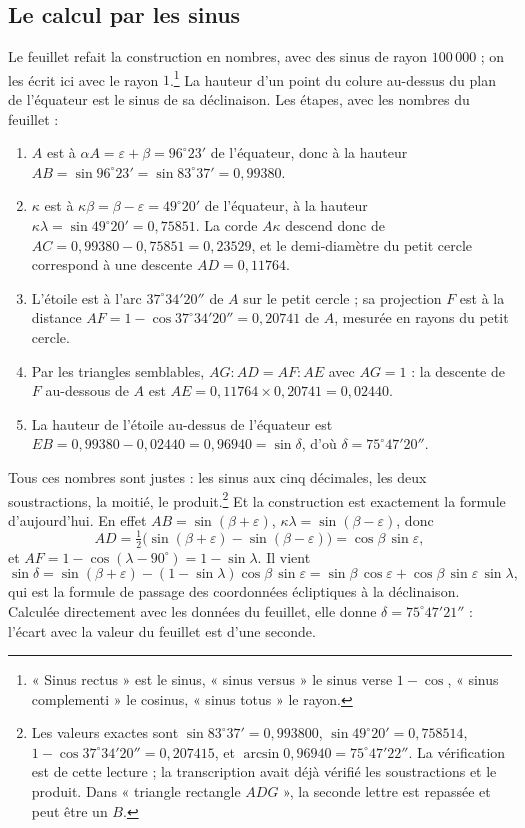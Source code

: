 \documentclass[11pt,a4paper]{article}
\begin{document}
\subsection*{Le calcul par les sinus}

Le feuillet refait la construction en nombres, avec des sinus de rayon
$100\,000$ ; on les écrit ici avec le rayon $1$.\footnote{« Sinus rectus » est
le sinus, « sinus versus » le sinus verse $1 - \cos$, « sinus complementi » le
cosinus, « sinus totus » le rayon.} La hauteur d'un point du colure au-dessus
du plan de l'équateur est le sinus de sa déclinaison. Les étapes, avec les
nombres du feuillet :

\begin{enumerate}
  \item[1.] $A$ est à $\alpha A = \varepsilon + \beta = 96^\circ 23'$ de
  l'équateur, donc à la hauteur $AB = \sin 96^\circ 23' = \sin 83^\circ 37'
  = 0{,}99380$.
  \item[2.] $\kappa$ est à $\kappa\beta = \beta - \varepsilon = 49^\circ 20'$ de
  l'équateur, à la hauteur $\kappa\lambda = \sin 49^\circ 20' = 0{,}75851$. La
  corde $A\kappa$ descend donc de $AC = 0{,}99380 - 0{,}75851 = 0{,}23529$, et
  le demi-diamètre du petit cercle correspond à une descente
  $AD = 0{,}11764$.
  \item[3.] L'étoile est à l'arc $37^\circ 34' 20''$ de $A$ sur le petit
  cercle ; sa projection $F$ est à la distance $AF = 1 - \cos 37^\circ 34' 20''
  = 0{,}20741$ de $A$, mesurée en rayons du petit cercle.
  \item[4.] Par les triangles semblables, $AG : AD = AF : AE$ avec $AG = 1$ :
  la descente de $F$ au-dessous de $A$ est $AE = 0{,}11764 \times 0{,}20741
  = 0{,}02440$.
  \item[5.] La hauteur de l'étoile au-dessus de l'équateur est
  $EB = 0{,}99380 - 0{,}02440 = 0{,}96940 = \sin\delta$, d'où
  $\delta = 75^\circ 47' 20''$.
\end{enumerate}

Tous ces nombres sont justes : les sinus aux cinq décimales, les deux
soustractions, la moitié, le produit.\footnote{Les valeurs exactes sont
$\sin 83^\circ 37' = 0{,}993800$, $\sin 49^\circ 20' = 0{,}758514$,
$1 - \cos 37^\circ 34' 20'' = 0{,}207415$, et
$\arcsin 0{,}96940 = 75^\circ 47' 22''$. La vérification est de cette lecture ;
la transcription avait déjà vérifié les soustractions et le produit. Dans
« triangle rectangle $ADG$ », la seconde lettre est repassée et peut être un
$B$.} Et la construction est exactement la formule d'aujourd'hui. En effet
$AB = \sin(\beta + \varepsilon)$, $\kappa\lambda = \sin(\beta - \varepsilon)$,
donc
\[
AD = \tfrac12\bigl(\sin(\beta+\varepsilon) - \sin(\beta-\varepsilon)\bigr)
= \cos\beta \,\sin\varepsilon ,
\]
et $AF = 1 - \cos(\lambda - 90^\circ) = 1 - \sin\lambda$. Il vient
\[
\sin\delta = \sin(\beta+\varepsilon) - (1 - \sin\lambda)\cos\beta\,\sin\varepsilon
= \sin\beta\,\cos\varepsilon + \cos\beta\,\sin\varepsilon\,\sin\lambda ,
\]
qui est la formule de passage des coordonnées écliptiques à la déclinaison.
Calculée directement avec les données du feuillet, elle donne
$\delta = 75^\circ 47' 21''$ : l'écart avec la valeur du feuillet est d'une
seconde.
\end{document}
